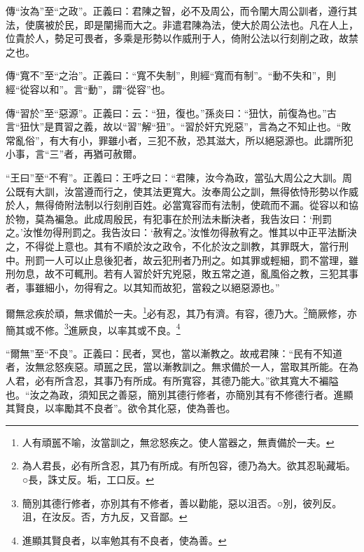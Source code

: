 {\noindent\zhuan{}\fzbyks 傳“汝為”至“之政”。正義曰：君陳之智，必不及周公，而令闡大周公訓者，遵行其法，使廣被於民，即是闡揚而大之。非遣君陳為法，使大於周公法也。凡在人上，位貴於人，勢足可畏者，多乘是形勢以作威刑于人，倚附公法以行刻削之政，故禁之也。 \par}

{\noindent\zhuan{}\fzbyks 傳“寬不”至“之治”。正義曰：“寬不失制”，則經“寬而有制”。“動不失和”，則經“從容以和”。言“動”，謂“從容”也。 \par}

{\noindent\zhuan{}\fzbyks 傳“習於”至“惡源”。正義曰：云：“狃，復也。”孫炎曰：“狃忕，前復為也。”古言“狃忕”是貫習之義，故以“習”解“狃”。“習於奸宄兇惡”，言為之不知止也。“敗常亂俗”，有大有小，罪雖小者，三犯不赦，恐其滋大，所以絕惡源也。此謂所犯小事，言“三”者，再猶可赦爾。 \par}

{\noindent\shu{}\fzkt “王曰”至“不宥”。正義曰：王呼之曰：“君陳，汝今為政，當弘大周公之大訓。周公既有大訓，汝當遵而行之，使其法更寬大。汝奉周公之訓，無得依恃形勢以作威於人，無得倚附法制以行刻削百姓。必當寬容而有法制，使疏而不漏。從容以和協於物，莫為褊急。此成周殷民，有犯事在於刑法未斷決者，我告汝曰：‘刑罰之。’汝惟勿得刑罰之。我告汝曰：‘赦宥之。’汝惟勿得赦宥之。惟其以中正平法斷決之，不得從上意也。其有不順於汝之政令，不化於汝之訓教，其罪既大，當行刑中。刑罰一人可以止息後犯者，故云犯刑者乃刑之。如其罪或輕細，罰不當理，雖刑勿息，故不可輒刑。若有人習於奸宄兇惡，敗五常之道，亂風俗之教，三犯其事者，事雖細小，勿得宥之。以其知而故犯，當殺之以絕惡源也。” \par}

爾無忿疾於頑，無求備於一夫。\footnote{人有頑嚚不喻，汝當訓之，無忿怒疾之。使人當器之，無責備於一夫。}必有忍，其乃有濟。有容，德乃大。\footnote{為人君長，必有所含忍，其乃有所成。有所包容，德乃為大。欲其忍恥藏垢。○長，誅丈反。垢，工口反。}簡厥修，亦簡其或不修。\footnote{簡別其德行修者，亦別其有不修者，善以勸能，惡以沮否。○別，彼列反。沮，在汝反。否，方九反，又音鄙。}進厥良，以率其或不良。\footnote{進顯其賢良者，以率勉其有不良者，使為善。}

{\noindent\shu{}\fzkt “爾無”至“不良”。正義曰：民者，冥也，當以漸教之。故戒君陳：“民有不知道者，汝無忿怒疾惡。頑嚚之民，當以漸教訓之。無求備於一人，當取其所能。在為人君，必有所含忍，其事乃有所成。有所寬容，其德乃能大。”欲其寬大不褊隘也。“汝之為政，須知民之善惡，簡別其德行修者，亦簡別其有不修德行者。進顯其賢良，以率勵其不良者”。欲令其化惡，使為善也。 \par}

